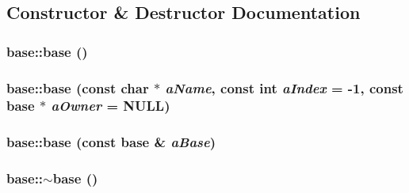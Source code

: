 \subsection{Constructor \& Destructor Documentation}
\hypertarget{classbase_a3b0362be8b58605e4975b969dd8131a4}{
\subsubsection[{base}]{\setlength{\rightskip}{0pt plus 5cm}base::base ()}}
\label{classbase_a3b0362be8b58605e4975b969dd8131a4}
\hypertarget{classbase_aa3d07f04318c6e353a7ea6652c548540}{
\subsubsection[{base}]{\setlength{\rightskip}{0pt plus 5cm}base::base (const char $\ast$ {\em aName}, \/  const int {\em aIndex} = {\ttfamily -\/1}, \/  const {\bf base} $\ast$ {\em aOwner} = {\ttfamily NULL})}}
\label{classbase_aa3d07f04318c6e353a7ea6652c548540}
\hypertarget{classbase_acba16924ff51ea95c2479951a459efb7}{
\subsubsection[{base}]{\setlength{\rightskip}{0pt plus 5cm}base::base (const {\bf base} \& {\em aBase})}}
\label{classbase_acba16924ff51ea95c2479951a459efb7}
\hypertarget{classbase_aab55b674bac3fd0abec406951dbda4eb}{
\subsubsection[{$\sim$base}]{\setlength{\rightskip}{0pt plus 5cm}base::$\sim$base ()}}
\label{classbase_aab55b674bac3fd0abec406951dbda4eb}


